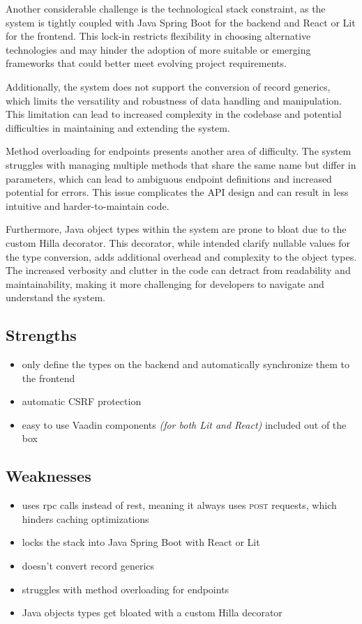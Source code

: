 Another considerable challenge is the technological stack constraint, as the system is tightly coupled with Java Spring Boot for the backend and React or Lit for the frontend. This lock-in restricts flexibility in choosing alternative technologies and may hinder the adoption of more suitable or emerging frameworks that could better meet evolving project requirements.

Additionally, the system does not support the conversion of record generics, which limits the versatility and robustness of data handling and manipulation. This limitation can lead to increased complexity in the codebase and potential difficulties in maintaining and extending the system.

Method overloading for endpoints presents another area of difficulty. The system struggles with managing multiple methods that share the same name but differ in parameters, which can lead to ambiguous endpoint definitions and increased potential for errors. This issue complicates the API design and can result in less intuitive and harder-to-maintain code.

Furthermore, Java object types within the system are prone to bloat due to the custom Hilla  decorator. This decorator, while intended clarify nullable values for the type conversion, adds additional overhead and complexity to the object types. The increased verbosity and clutter in the code can detract from readability and maintainability, making it more challenging for developers to navigate and understand the system.


\subsection{Strengths}
\label{subsec:hilla:strengths}
\begin{itemize}
    \item only define the types on the backend and automatically synchronize them to the frontend
    \item automatic CSRF protection
    \item easy to use Vaadin components \textit{(for both Lit and React)} included out of the box
\end{itemize}

\subsection{Weaknesses}
\label{subsec:hilla:weaknesses}
\begin{itemize}
    \item uses \acrshort{rpc} calls instead of \acrshort{rest}, meaning it always uses \textsc{post} requests, which hinders caching optimizations
    \item locks the stack into Java Spring Boot with React or Lit
    \item doesn't convert record generics
    \item struggles with method overloading for endpoints
    \item Java objects types get bloated with a custom Hilla  decorator
\end{itemize}

